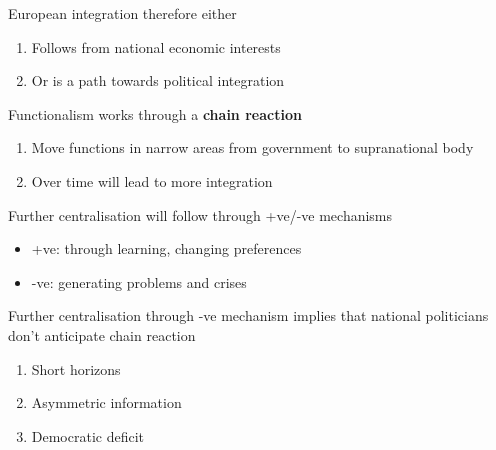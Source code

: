\documentclass{beamer}
\begin{document}
\begin{frame}
  European integration therefore either
  \medskip
  \begin{enumerate}
    \item Follows from national economic interests
    \medskip
    \item Or is a path towards political integration
  \end{enumerate}  
\end{frame}

\begin{frame}
  Functionalism works through a \textbf{chain reaction}
  \begin{enumerate}
    \item Move functions in narrow areas from government to supranational body
    \item Over time will lead to more integration 
  \end{enumerate}
  \medskip
  Further centralisation will follow through +ve/-ve mechanisms
  \begin{itemize}
    \item +ve: through learning, changing preferences
    \item -ve: generating problems and crises
  \end{itemize}
\end{frame}

\begin{frame}
  Further centralisation through -ve mechanism implies that national politicians don't anticipate chain reaction  
  \medskip
  \begin{enumerate}
    \item Short horizons
    \item Asymmetric information
    \item Democratic deficit
  \end{enumerate}
\end{frame}
\end{document}
